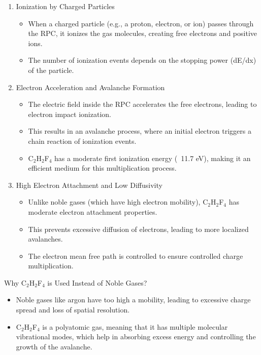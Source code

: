 \begin{enumerate}
	
	\item Ionization by Charged Particles
	\begin{itemize}
		\item When a charged particle (e.g., a proton, electron, or ion) passes through the RPC, it ionizes the gas molecules, creating free electrons and positive ions.
		\item The number of ionization events depends on the stopping power (dE/dx) of the particle.
	\end{itemize}
	\item Electron Acceleration and Avalanche Formation
	\begin{itemize}
		\item The electric field inside the RPC accelerates the free electrons, leading to electron impact ionization.
		\item This results in an avalanche process, where an initial electron triggers a chain reaction of ionization events.
		\item C$_2$H$_2$F$_4$ has a moderate first ionization energy (~11.7 eV), making it an efficient medium for this multiplication process.
	\end{itemize}
	\item High Electron Attachment and Low Diffusivity
	\begin{itemize}
		\item Unlike noble gases (which have high electron mobility), C$_2$H$_2$F$_4$ has moderate electron attachment properties.
		\item This prevents excessive diffusion of electrons, leading to more localized avalanches.
		\item The electron mean free path is controlled to ensure controlled charge multiplication.
	\end{itemize}
	
\end{enumerate}


Why C$_2$H$_2$F$_4$ is Used Instead of Noble Gases?

\begin{itemize}
	\item Noble gases like argon have too high a mobility, leading to excessive charge spread and loss of spatial resolution.
	\item C$_2$H$_2$F$_4$ is a polyatomic gas, meaning that it has multiple molecular vibrational modes, which help in absorbing excess energy and controlling the growth of the avalanche.
\end{itemize}


